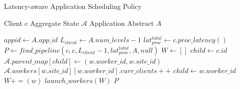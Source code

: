 \begin{algorithm}
\caption{Latency-aware Application Scheduling Policy}
\label{algo:oneedge_scheduling_policy}
\begin{algorithmic}[1]
\Require Client c
\Require Aggregate State $\mathcal{A}$
\Require Application Abstract $A$

\State $appid \gets A.app\_id$
\State $L_{client} \gets A.num\_levels-1$ 
\State $lat_{proc}^{total} \gets c.proc\_latency()$ 
\State $P \gets find\_pipeline \left( c, c, L_{client} - 1, lat_{proc}^{total}, A, null \right)$
\State $W \gets []$ 
\State $child \gets c.id$
 
    \State $\mathcal{A}.parent\_map[child] \gets \left( w.worker\_id, w.site\_id \right)$
    \State $\mathcal{A}.workers[w.site\_id][w.worker\_id].curr\_clients ++$
    \State $child \gets w.worker\_id$
        \State $W += \left( w \right)$  
    \EndIf
\EndFor
\State $launch\_workers \left( W \right)$
\State \Return $P$
\end{algorithmic}
\end{algorithm}


